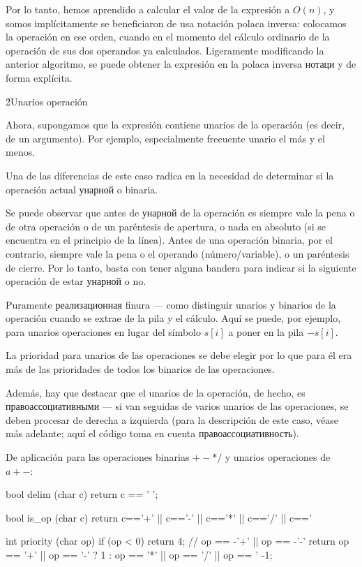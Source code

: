 Por lo tanto, hemos aprendido a calcular el valor de la expresión a $O (n)$, y somos implícitamente se beneficiaron de usa notación polaca inversa: colocamos la operación en ese orden, cuando en el momento del cálculo ordinario de la operación de sus dos operandos ya calculados. Ligeramente modificando la anterior algoritmo, se puede obtener la expresión en la polaca inversa нотаци y de forma explícita.


\h2{Unarios operación}

Ahora, supongamos que la expresión contiene unarios de la operación (es decir, de un argumento). Por ejemplo, especialmente frecuente unario el más y el menos.

Una de las diferencias de este caso radica en la necesidad de determinar si la operación actual унарной o binaria.

Se puede observar que antes de унарной de la operación es siempre vale la pena o de otra operación o de un paréntesis de apertura, o nada en absoluto (si se encuentra en el principio de la línea). Antes de una operación binaria, por el contrario, siempre vale la pena o el operando (número/variable), o un paréntesis de cierre. Por lo tanto, basta con tener alguna bandera para indicar si la siguiente operación de estar унарной o no.

Puramente реализационная finura --- como distinguir unarios y binarios de la operación cuando se extrae de la pila y el cálculo. Aquí se puede, por ejemplo, para unarios operaciones en lugar del símbolo $s[i]$ a poner en la pila $-s[i]$.

La prioridad para unarios de las operaciones se debe elegir por lo que para él era más de las prioridades de todos los binarios de las operaciones.

Además, hay que destacar que el unarios de la operación, de hecho, es правоассоциативными --- si van seguidas de varios unarios de las operaciones, se deben procesar de derecha a izquierda (para la descripción de este caso, véase más adelante; aquí el código toma en cuenta правоассоциативность).

De aplicación para las operaciones binarias $+-*/$ y unarios operaciones de $a+-$:

\code
bool delim (char c) {
return c == ' ';
}

bool is_op (char c) {
return c=='+' || c=='-' || c=='*' || c=='/' || c=='%
}

int priority (char op) {
if (op < 0)
return 4; // op == -'+' || op == -'-'
return
op == '+' || op == '-' ? 1 :
op == '*' || op == '/' || op == '%
-1;
}

